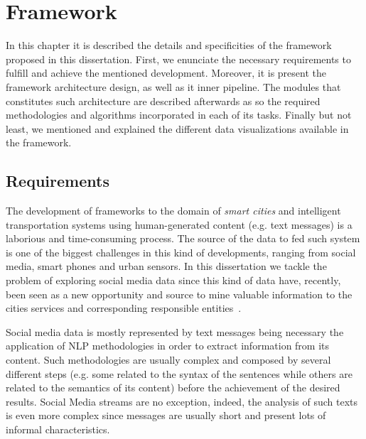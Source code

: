 \chapter{Framework}
\label{chap:framework}

\minitoc \mtcskip \noindent

In this chapter it is described the details and specificities of the framework proposed in this dissertation. First, we enunciate the necessary requirements to fulfill and achieve the mentioned development. Moreover, it is present the framework architecture design, as well as it inner pipeline. The modules that constitutes such architecture are described afterwards as so the required methodologies and algorithms incorporated in each of its tasks. Finally but not least, we mentioned and explained the different data visualizations available in the framework.

\section{Requirements}\label{sec:requirements}

The development of frameworks to the domain of \textit{smart cities} and intelligent transportation systems using human-generated content (e.g. text messages) is a laborious and time-consuming process. The source of the data to fed such system is one of the biggest challenges in this kind of developments, ranging from social media, smart phones and urban sensors. In this dissertation we tackle the problem of exploring social media data since this kind of data have, recently, been seen as a new opportunity and source to mine valuable information to the cities services and corresponding responsible entities~\cite{musto2015crowdpulse}.

Social media data is mostly represented by text messages being necessary the application of \gls{NLP} methodologies in order to extract information from its content. Such methodologies are usually complex and composed by several different steps (e.g. some related to the syntax of the sentences while others are related to the semantics of its content) before the achievement of the desired results. Social Media streams are no exception, indeed, the analysis of such texts is even more complex since messages are usually short and present lots of informal characteristics.

